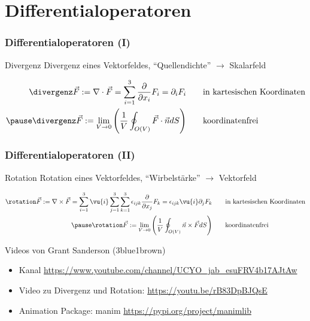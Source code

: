 \section{Differentialoperatoren}
\begin{frame}
  \frametitle{Differentialoperatoren (I)}

  \begin{block}{Divergenz}
    Divergenz eines Vektorfeldes,
    \enquote{Quellendichte} $\to$ Skalarfeld\pause

    \begin{align*}
      \divergenz \vec{F} := \nabla \cdot \vec{F} =
      \sum_{i=1}^3 \frac{\partial}{\partial x_i} F_i
      = \partial_i F_i & \qquad \text{in kartesischen
                         Koordinaten}\\ \pause
      \divergenz \vec{F} := \lim_{V \to 0}\left(
      \frac{1}{V} \oint_{O(V)} \vec{F}\cdot \vec{n}
      dS\right) & \qquad\text{koordinatenfrei}
    \end{align*}
    
  \end{block}
\end{frame}
\begin{frame}
  \frametitle{Differentialoperatoren (II)}

  \begin{block}{Rotation}
    Rotation eines Vektorfeldes,
    \enquote{Wirbelstärke} $\to$ Vektorfeld\pause

    \begin{align*}
      \rotation \vec{F} := \nabla \times \vec{F} =
      \sum_{i=1}^3\vu{i}\sum_{j=1}^3\sum_{k=1}^3
      \epsilon_{ijk}\frac{\partial}{\partial x_j}
      F_k = \epsilon_{ijk} \vu{i} \partial_j F_k & \qquad \text{in kartesischen
                                                      Koordinaten}\\ \pause
      \rotation \vec{F} := \lim_{V \to 0}\left(
      \frac{1}{V} \oint_{O(V)} \vec{n}\times \vec{F}
      dS\right)
                                                    & \qquad\text{koordinatenfrei}
    \end{align*}
  \end{block}\pause

  \begin{block}{Videos von Grant Sanderson
      (3blue1brown)}
    \begin{itemize}
    \item Kanal \url{https://www.youtube.com/channel/UCYO_jab_esuFRV4b17AJtAw}
    \item  Video zu Divergenz und Rotation:
      \url{https://youtu.be/rB83DpBJQsE}
    \item Animation Package: manim \url{https://pypi.org/project/manimlib}
    \end{itemize}
  \end{block}
  
\end{frame}

